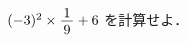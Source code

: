 \documentclass[../../../../hsm_tok_q.tex]{subfiles}
\begin{document}
    
    $(-3)^2\times\myfraca{1}{9}+6$\; を計算せよ．
\end{document}
